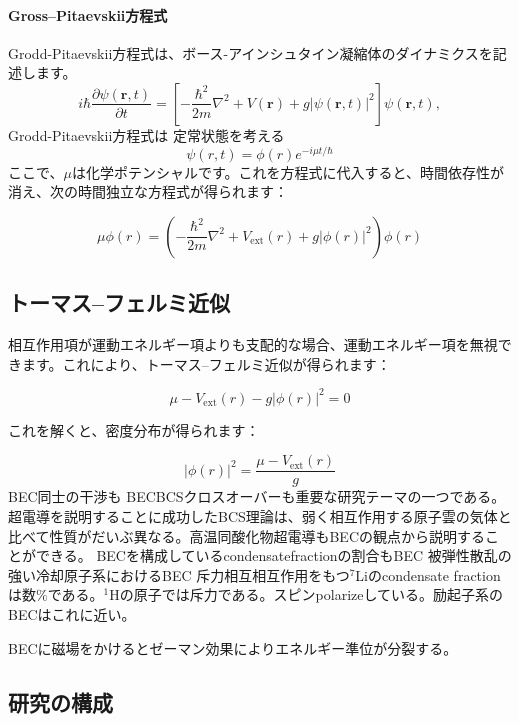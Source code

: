 \paragraph{Gross–Pitaevskii方程式}
Grodd-Pitaevskii方程式は、ボース-アインシュタイン凝縮体のダイナミクスを記述します。
\begin{equation}
i \hbar \frac{\partial \psi(\mathbf{r}, t)}{\partial t} = \left[ -\frac{\hbar^2}{2m} \nabla^2 + V(\mathbf{r}) + g |\psi(\mathbf{r}, t)|^2 \right] \psi(\mathbf{r}, t),
\end{equation}
Grodd-Pitaevskii方程式は
定常状態を考える
\begin{equation}
\psi(r, t) = \phi(r) e^{-i \mu t / \hbar}
\end{equation}
ここで、$\mu$は化学ポテンシャルです。これを方程式に代入すると、時間依存性が消え、次の時間独立な方程式が得られます：

\begin{equation}
\mu \phi(r) = \left( -\frac{\hbar^2}{2m} \nabla^2 + V_{\text{ext}}(r) + g |\phi(r)|^2 \right) \phi(r)
\end{equation}

\subsection*{トーマス–フェルミ近似}

相互作用項が運動エネルギー項よりも支配的な場合、運動エネルギー項を無視できます。これにより、トーマス–フェルミ近似が得られます：

\begin{equation}
\mu - V_{\text{ext}}(r) - g |\phi(r)|^2 = 0
\end{equation}

これを解くと、密度分布が得られます：

\begin{equation}
|\phi(r)|^2 = \frac{\mu - V_{\text{ext}}(r)}{g}
\end{equation}
BEC同士の干渉も
BECBCSクロスオーバーも重要な研究テーマの一つである。超電導を説明することに成功したBCS理論は、弱く相互作用する原子雲の気体と比べて性質がだいぶ異なる。高温同酸化物超電導もBECの観点から説明することができる。
BECを構成しているcondensatefractionの割合もBEC
被弾性散乱の強い冷却原子系におけるBEC
斥力相互相互作用をもつ$^7$Liのcondensate fractionは数$\%$である。$^1$Hの原子では斥力である。スピンpolarizeしている。励起子系のBECはこれに近い。

BECに磁場をかけるとゼーマン効果によりエネルギー準位が分裂する。
\subsection{研究の構成}

